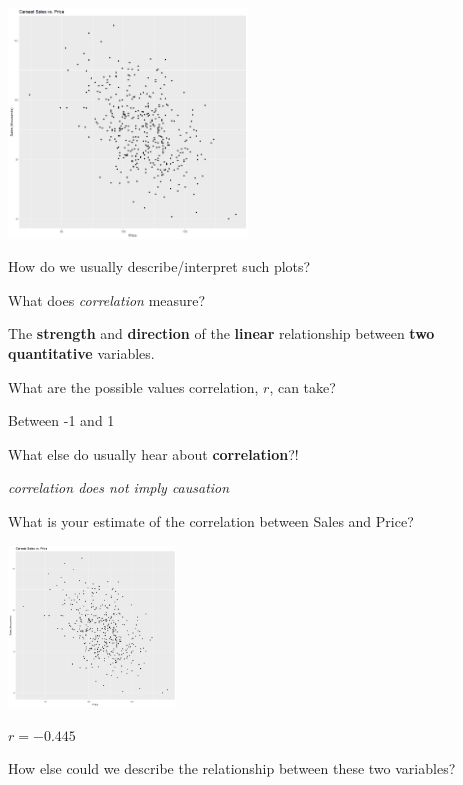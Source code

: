\begin{frame}
\begin{center}
	\includegraphics[width = 2.5in]{SalesPricePoints.png}
\end{center}
\bi
	\item How do we usually describe/interpret such plots?
\ei
\end{frame}

\begin{frame}
\bi
	\item What does \emph{correlation} measure?
	\pause
	\bi
		\item The \textbf{strength} and \textbf{direction} of the \textbf{linear} relationship between \textbf{two quantitative} variables.
	\ei
	\item What are the possible values correlation, $r$, can take?
	\pause
	\bi
		\item Between -1 and 1
	\ei
	\pause
	\item What else do usually hear about \textbf{correlation}?!
	\pause
		\bi
			\item \emph{correlation does not imply causation}
		\ei
\ei

\end{frame}

\begin{frame}
\bi
	\item What is your estimate of the correlation between Sales and Price?
\ei
\begin{center}
	\includegraphics[width = 1.75in]{SalesPricePoints.png}
\end{center}
\pause
\bi
	\item $r = -0.445$
	\item How else could we describe the relationship between these two variables?
\ei
\end{frame}

